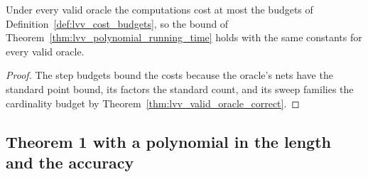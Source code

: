 \begin{lemma}
    \label{thm:lvv_valid_oracle_cost}
    \leanok
    Under every valid oracle the computations cost at most the budgets of
    Definition~\ref{def:lvv_cost_budgets}, so the bound of
    Theorem~\ref{thm:lvv_polynomial_running_time} holds with the same
    constants for every valid oracle.
\end{lemma}
\begin{proof}
    \leanok
    The step budgets bound the costs because the oracle's nets have the
    standard point bound, its factors the standard count, and its sweep
    families the cardinality budget by
    Theorem~\ref{thm:lvv_valid_oracle_correct}.
\end{proof}

\subsection{Theorem 1 with a polynomial in the length and the accuracy}
\label{sec:lvv_theorem_one_form}

